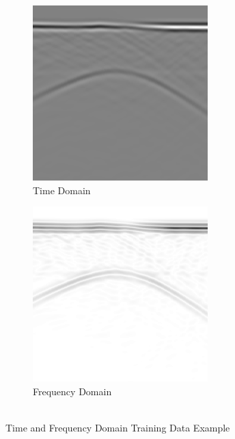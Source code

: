 \begin{figure}[H]
  \centering
  \begin{subfigure}[b]{0.45\linewidth}
    \includegraphics[width=\linewidth]{figures/peplinski_post.png}
    \caption{Time Domain}
  \end{subfigure}
  \begin{subfigure}[b]{0.45\linewidth}
    \includegraphics[width=\linewidth]{figures/frequency_post.png}
    \caption{Frequency Domain}
  \end{subfigure}
  
  \caption{\\Time and Frequency Domain Training Data Example}
  \label{fig:training_examples}
\end{figure}

